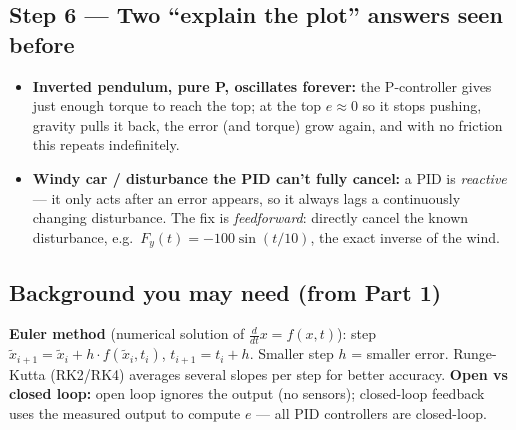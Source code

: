 \subsection*{Step 6 --- Two ``explain the plot'' answers seen before}
\begin{itemize}
  \item \textbf{Inverted pendulum, pure P, oscillates forever:} the P-controller gives just enough
        torque to reach the top; at the top $e\approx 0$ so it stops pushing, gravity pulls it back,
        the error (and torque) grow again, and with no friction this repeats indefinitely.
  \item \textbf{Windy car / disturbance the PID can't fully cancel:} a PID is \emph{reactive} --- it
        only acts after an error appears, so it always lags a continuously changing disturbance.
        The fix is \emph{feedforward}: directly cancel the known disturbance, e.g.\
        $F_y(t) = -100\sin(t/10)$, the exact inverse of the wind.
\end{itemize}

\subsection*{Background you may need (from Part 1)}
\textbf{Euler method} (numerical solution of $\frac{d}{dt}x=f(x,t)$): step
$\tilde x_{i+1} = \tilde x_i + h\cdot f(\tilde x_i,t_i)$, $t_{i+1}=t_i+h$. Smaller step $h$ = smaller
error. Runge-Kutta (RK2/RK4) averages several slopes per step for better accuracy.
\textbf{Open vs closed loop:} open loop ignores the output (no sensors); closed-loop feedback uses
the measured output to compute $e$ --- all PID controllers are closed-loop.